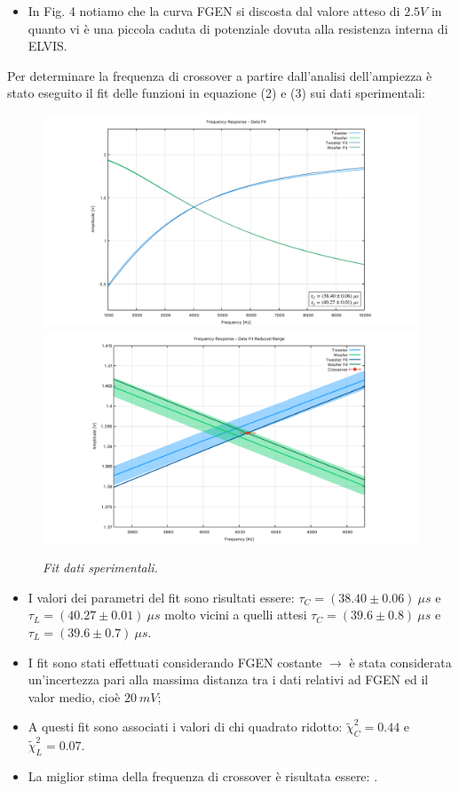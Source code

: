 \documentclass{beamer}
\begin{document}
\begin{frame}
    \begin{itemize}
        \item In Fig. 4 notiamo che la curva FGEN si discosta dal valore atteso di $2.5 V$ in quanto vi è una piccola caduta di potenziale dovuta alla resistenza interna di ELVIS.
    \end{itemize}

    Per determinare la frequenza di crossover a partire dall'analisi dell'ampiezza è stato eseguito il fit delle funzioni in equazione (2) e (3) sui dati sperimentali:
    \begin{figure}
        \includegraphics[width=0.45\linewidth]{../results/CFAmplFit.pdf}
        \includegraphics[width=0.45\linewidth]{../results/CFAmplRRFit.pdf}
        \caption{\textit{Fit dati sperimentali.}}
    \end{figure}
\end{frame}

\begin{frame}
    \begin{itemize}
        \item <1-> I valori dei parametri del fit sono risultati essere: $\tau_C = (38.40 \pm 0.06) \ \mu s$ e $\tau_L = (40.27 \pm 0.01) \ \mu s$ 
        molto vicini a quelli attesi $\tau_C=(39.6\pm0.8) \ \mu s $ e $\tau_L=(39.6\pm0.7) \ \mu s $.
        \item <2-> I fit sono stati effettuati considerando FGEN costante $\rightarrow$ è stata considerata un'incertezza pari alla massima distanza tra 
        i dati relativi ad FGEN ed il valor medio, cioè $20 \ mV$;
        \item <3-> A questi fit sono associati i valori di chi quadrato ridotto: $\tilde{\chi}^2_C=0.44$ e $\tilde{\chi}^2_L=0.07$. 
        \item <4-> La miglior stima della frequenza di crossover è risultata essere: \color{blue}{$\nu_0=(4024 \pm 4) \ Hz$}.
    \end{itemize}
\end{frame}
\end{document}
